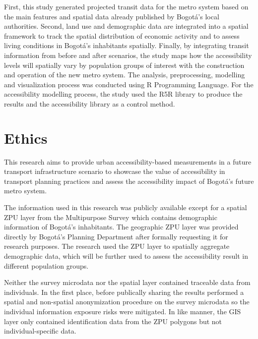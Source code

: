 \documentclass[12pt, a4paper]{report}
\begin{document}
First, this study generated projected transit data for the metro system based on the main features and spatial data already published by Bogotá's local authorities. Second, land use and demographic data are integrated into a spatial framework to track the spatial distribution of economic activity and to assess living conditions in Bogotá's inhabitants spatially. Finally, by integrating transit information from before and after scenarios, the study maps how the accessibility levels will spatially vary by population groups of interest with the construction and operation of the new metro system. The analysis, preprocessing, modelling and visualization process was conducted using R Programming Language. For the accessibility modelling process, the study used the R5R library to produce the results and the accessibility library as a control method.


\section{Ethics}

This research aims to provide urban accessibility-based measurements in a future transport infrastructure scenario to showcase the value of accessibility in transport planning practices and assess the accessibility impact of Bogotá's future metro system.

The information used in this research was publicly available except for a spatial ZPU layer \citep{secretariadistritaldeplaneacionMicrodatosEncuestaMultiproposito2023} from the Multipurpose Survey \citep{secretariadistritaldeplaneacionCapaGeograficaEncuesta2023} which contains demographic information of Bogotá's inhabitants. The geographic ZPU layer was provided directly by Bogotá's Planning Department after formally requesting it for research purposes. The research used the ZPU layer to spatially aggregate demographic data, which will be further used to assess the accessibility result in different population groups.

Neither the survey microdata nor the spatial layer contained traceable data from individuals. In the first place, before publically sharing the results \cite{secretariadistritaldeplaneacionMicrodatosEncuestaMultiproposito2023} performed a spatial and non-spatial anonymization procedure on the survey microdata so the individual information exposure risks were mitigated. In like manner, the GIS layer only contained identification data from the ZPU polygons but not individual-specific data.
\end{document}
